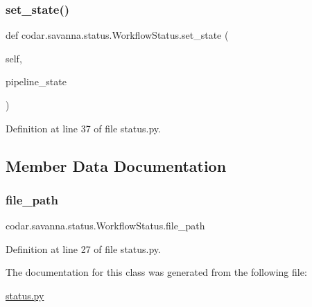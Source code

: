 \subsubsection{\texorpdfstring{set\+\_\+state()}{set\_state()}}
{\footnotesize\ttfamily def codar.\+savanna.\+status.\+Workflow\+Status.\+set\+\_\+state (\begin{DoxyParamCaption}\item[{}]{self,  }\item[{}]{pipeline\+\_\+state }\end{DoxyParamCaption})}



Definition at line 37 of file status.\+py.



\subsection{Member Data Documentation}
\mbox{\label{classcodar_1_1savanna_1_1status_1_1_workflow_status_ae4eb41515ae3ac77a11e1905835497e6}} 
\subsubsection{\texorpdfstring{file\+\_\+path}{file\_path}}
{\footnotesize\ttfamily codar.\+savanna.\+status.\+Workflow\+Status.\+file\+\_\+path}



Definition at line 27 of file status.\+py.



The documentation for this class was generated from the following file\+:\begin{DoxyCompactItemize}
\item 
\hyperlink{status_8py}{status.\+py}\end{DoxyCompactItemize}
